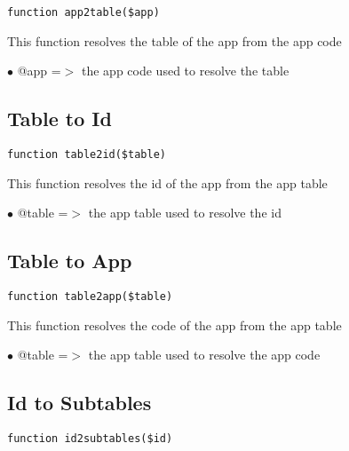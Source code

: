 \documentclass[a4paper]{book}
\begin{document}
\begin{lstlisting}
function app2table($app)
\end{lstlisting}

This function resolves the table of the app from the app code

\begin{compactitem}
\item[\color{myblue}$\bullet$] @app =$>$ the app code used to resolve the table
\end{compactitem}

\hypertarget{toc28}{}
\subsection{Table to Id}

\begin{lstlisting}
function table2id($table)
\end{lstlisting}

This function resolves the id of the app from the app table

\begin{compactitem}
\item[\color{myblue}$\bullet$] @table =$>$ the app table used to resolve the id
\end{compactitem}

\hypertarget{toc29}{}
\subsection{Table to App}

\begin{lstlisting}
function table2app($table)
\end{lstlisting}

This function resolves the code of the app from the app table

\begin{compactitem}
\item[\color{myblue}$\bullet$] @table =$>$ the app table used to resolve the app code
\end{compactitem}

\hypertarget{toc30}{}
\subsection{Id to Subtables}

\begin{lstlisting}
function id2subtables($id)
\end{lstlisting}
\end{document}
